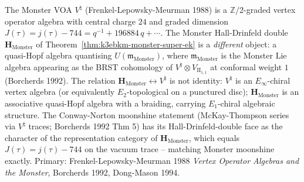 \begin{remark}
\label{rem:k3ebkm-monster-vs-moonshine}
The Monster VOA $V^\natural$ (Frenkel-Lepowsky-Meurman 1988) is a
$\mathbb Z/2$-graded vertex operator algebra with central charge $24$
and graded dimension $J(\tau) = j(\tau) - 744 = q^{-1} + 196884\, q + \cdots$.
The Monster Hall-Drinfeld double $\mathbf H_{\mathrm{Monster}}$ of
Theorem~\ref{thm:k3ebkm-monster-super-ek} is a \emph{different} object:
a quasi-Hopf algebra quantising $U(\mathfrak m_{\mathrm{Monster}})$,
where $\mathfrak m_{\mathrm{Monster}}$ is the Monster Lie algebra
appearing as the BRST cohomology of $V^\natural\otimes V_{\mathrm{II}_{1,1}}$
at conformal weight $1$ (Borcherds 1992). The relation
$\mathbf H_{\mathrm{Monster}} \leftrightarrow V^\natural$ is not identity:
$V^\natural$ is an $E_\infty$-chiral vertex algebra (or equivalently
$E_2$-topological on a punctured disc);
$\mathbf H_{\mathrm{Monster}}$ is an associative quasi-Hopf algebra
with a braiding, carrying $E_1$-chiral algebraic structure. The
Conway-Norton moonshine statement (McKay-Thompson series via $V^\natural$
traces; Borcherds 1992 Thm 5) has its Hall-Drinfeld-double face
as the character of the representation category of
$\mathbf H_{\mathrm{Monster}}$, which equals $J(\tau) = j(\tau) - 744$
on the vacuum trace -- matching Monster moonshine exactly.
Primary: Frenkel-Lepowsky-Meurman 1988 \emph{Vertex Operator
Algebras and the Monster}, Borcherds 1992, Dong-Mason 1994.
\end{remark}

